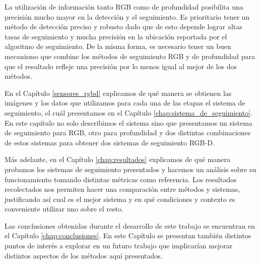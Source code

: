La utilización de información tanto RGB como de profundidad posibilita una precisión mucho mayor en la detección y el seguimiento. Es prioritario tener un método de detección preciso y robusto dado que de esto depende lograr altas tasas de seguimiento y mucha precisión en la ubicación reportada por el algoritmo de seguimiento. De la misma forma, es necesario tener un buen mecanismo que combine los métodos de seguimiento RGB y de profundidad para que el resultado refleje una precisión por lo menos igual al mejor de los dos métodos.

En el Capítulo \ref{sensores_rgbd} explicamos de qué manera se obtienen las imágenes y los datos que utilizamos para cada una de las etapas el sistema de seguimiento, el cuál presentamos en el Capítulo \ref{chap:sistema_de_seguimiento}. En este capítulo no solo describimos el sistema sino que presentamos un sistema de seguimiento para RGB, otro para profundidad y dos distintas combinaciones de estos sistemas para obtener dos sistemas de seguimiento RGB-D.

Más adelante, en el Capítulo \ref{chap:resultados} explicamos de qué manera probamos los sistemas de seguimiento presentados y hacemos un análisis sobre su funcionamiento tomando distintas métricas como referencia. Los resultados recolectados nos permiten hacer una comparación entre métodos y sistemas, justificando así cual es el mejor sistema y en qué condiciones y contexto es conveniente utilizar uno sobre el resto.

Las conclusiones obtenidas durante el desarrollo de este trabajo se encuentran en el Capítulo \ref{chap:conclusiones}. En este Capítulo se presentan también distintos puntos de interés a explorar en un futuro trabajo que implicarían mejorar distintos aspectos de los métodos aquí presentados.
